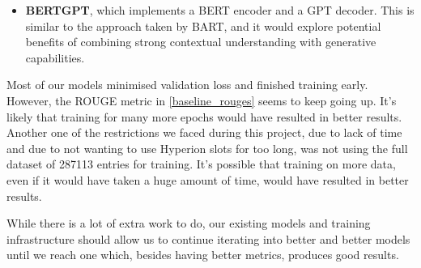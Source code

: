 \begin{description}[style=nextline,noitemsep]
\begin{itemize}
			\item \textbf{BERTGPT}, which implements a BERT encoder and a GPT decoder.
				This is similar to the approach taken by BART\cite{bart_model}, and it would explore potential benefits of combining strong contextual understanding with generative capabilities.
		\end{itemize}
	\item[Just training more data and for more time]
		Most of our models minimised validation loss and finished training early.
		However, the ROUGE metric in \cref{baseline_rouges} seems to keep going up.
		It's likely that training for many more epochs would have resulted in better results. \\
		Another one of the restrictions we faced during this project, due to lack of time and due to not wanting to use Hyperion slots for too long, was not using the full dataset of \num{287113} entries for training.
		It's possible that training on more data, even if it would have taken a huge amount of time, would have resulted in better results.
\end{description}

While there is a lot of extra work to do, our existing models and training infrastructure should allow us to continue iterating into better and better models until we reach one which, besides having better metrics, produces good results.
